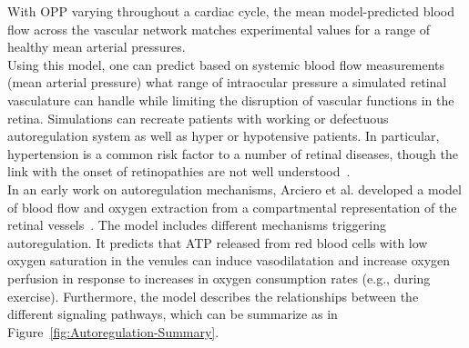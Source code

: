 \documentclass[12pt,a4paper]{article}
\begin{document}
With OPP varying throughout a cardiac cycle, the mean model-predicted blood flow across the vascular network matches experimental values for a range of healthy mean arterial pressures.\\
Using this model, one can predict based on systemic blood flow measurements (mean arterial pressure) what range of intraocular pressure a simulated retinal vasculature can handle while limiting the disruption of vascular functions in the retina.
Simulations can recreate patients with working or defectuous autoregulation system as well as hyper or hypotensive patients.
In particular, hypertension is a common risk factor to a number of retinal diseases, though the link with the onset of retinopathies are not well understood~\cite{Klein_2004, Leeman_2019}.\\
In an early work on autoregulation mechanisms, Arciero et al. developed a model of blood flow and oxygen extraction from a compartmental representation of the retinal vessels~\cite{Arciero_2008}.
The model includes different mechanisms triggering autoregulation.
It predicts that ATP released from red blood cells with low oxygen saturation in the venules can induce vasodilatation and increase oxygen perfusion in response to increases in oxygen consumption rates (e.g., during exercise).
Furthermore, the model describes the relationships between the different signaling pathways, which can be summarize as in Figure~\ref{fig:Autoregulation-Summary}.
\end{document}
